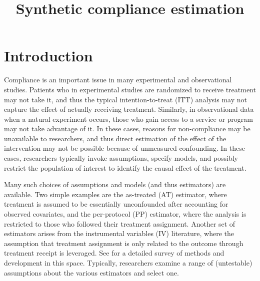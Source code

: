 \documentclass{article}
\title{Synthetic compliance estimation}
\begin{document}
\maketitle

\section{Introduction}

Compliance is an important issue in many experimental and observational studies. Patients who in experimental studies are randomized to receive treatment may not take it, and thus the typical intention-to-treat (ITT) analysis may not capture the effect of actually receiving treatment. Similarly, in observational data when a natural experiment occurs, those who gain access to a service or program may not take advantage of it. In these cases, reasons for non-compliance may be unavailable to researchers, and thus direct estimation of the effect of the intervention may not be possible because of unmeasured confounding. In these cases, researchers typically invoke assumptions, specify models, and possibly restrict the population of interest to identify the causal effect of the treatment. 

Many such choices of assumptions and models (and thus estimators) are available. Two simple examples are the as-treated (AT) estimator, where treatment is assumed to be essentially unconfounded after accounting for observed covariates, and the per-protocol (PP) estimator, where the analysis is restricted to those who followed their treatment assignment. Another set of estimators arises from the instrumental variables (IV) literature, where the assumption that treatment assignment is only related to the outcome through treatment receipt is leveraged. See \cite{imbens2014instrumental} for a detailed survey of methods and development in this space. Typically, researchers examine a range of (untestable) assumptions about the various estimators and select one. 
\end{document}
